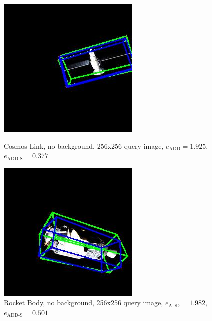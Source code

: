 \begin{figure}[h]
    \centering
    \begin{minipage}{0.45\linewidth}
        \centering
        \includegraphics[width=\linewidth]{data/fig9.jpg} %
        \caption{Cosmos Link, no background, 256x256 query image, $e_\mathrm{ADD}=1.925$, $e_{\mathrm{ADD}\text{-}\mathrm{S}}=0.377$ }
        \label{fig:fig9}
    \end{minipage}\hfill
    \begin{minipage}{0.45\linewidth}
        \centering
        \includegraphics[width=\linewidth]{data/fig10.jpg} %
        \caption{Rocket Body, no background, 256x256 query image, $e_\mathrm{ADD}=1.982$, $e_{\mathrm{ADD}\text{-}\mathrm{S}}=0.501$ }
        \label{fig:fig10}
    \end{minipage}
\end{figure}

